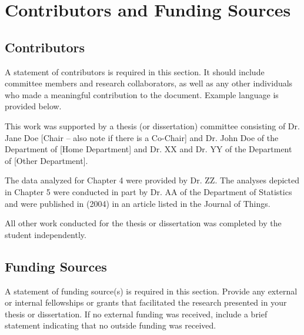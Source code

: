 \chapter*{Contributors and Funding Sources}

\section*{\bfseries Contributors}
A statement of contributors is required in this section. It should include committee members and research collaborators, as well as any other individuals who made a meaningful contribution to the document. Example language is provided below.

This work was supported by a thesis (or dissertation) committee consisting of Dr. Jane Doe [Chair -- also note if there is a Co-Chair] and Dr. John Doe of the Department of [Home Department] and Dr. XX and Dr. YY of the Department of [Other Department].

The data analyzed for Chapter 4 were provided by Dr. ZZ. The analyses depicted in Chapter 5 were conducted in part by Dr. AA of the Department of Statistics and were published in (2004) in an article listed in the Journal of Things.

All other work conducted for the thesis or dissertation was completed by the student independently.

\section*{\bfseries Funding Sources}
A statement of funding source(s) is required in this section. Provide any external or internal fellowships or grants that facilitated the research presented in your thesis or dissertation. If no external funding was received, include a brief statement indicating that no outside funding was received.
